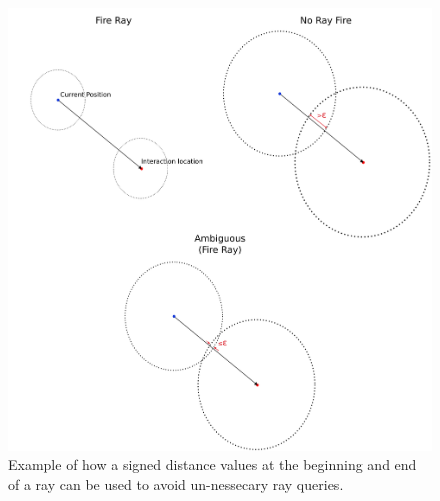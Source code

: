 \documentclass[12pt, a4paper]{article}
\begin{document}
\begin{figure}
  \centering
  \includegraphics[scale=0.4]{preconditioner_ex.png}
  \caption{Example of how a signed distance values at the beginning and end of a ray can be used to avoid un-nessecary ray queries.}
  \label{preconditioner_ex}
\end{figure}




\end{document}
